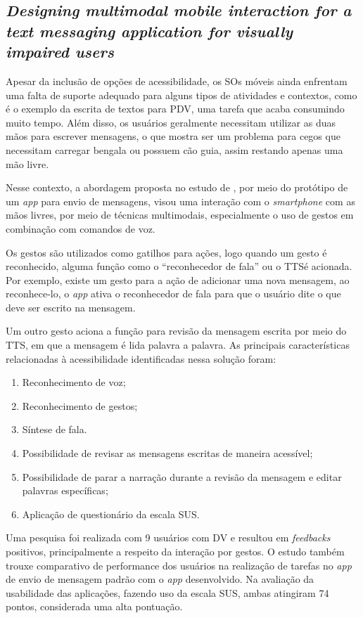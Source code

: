 \subsection{\emph{Designing multimodal mobile interaction for a text messaging application for visually impaired users}}

Apesar da inclusão de opções de acessibilidade, os SOs móveis ainda enfrentam uma falta de suporte adequado para alguns tipos de atividades e contextos, como é o exemplo da escrita de textos para PDV, uma tarefa que acaba consumindo muito tempo.
Além disso, os usuários geralmente necessitam utilizar as duas mãos para escrever mensagens, o que mostra ser um problema para cegos que necessitam carregar bengala ou possuem cão guia, assim restando apenas uma mão livre.

Nesse contexto, a abordagem proposta no estudo de , por meio do protótipo de um \emph{app} para envio de mensagens, visou uma interação com o \emph{smartphone}
com as mãos livres, por meio de técnicas multimodais, especialmente o uso de gestos em combinação com comandos de voz.

Os gestos são utilizados como gatilhos para ações, logo quando um gesto é reconhecido, alguma função como o ``reconhecedor de fala'' ou o TTS\@ é acionada.
Por exemplo, existe um gesto para a ação de adicionar uma nova mensagem, ao reconhece-lo, o \emph{app} ativa o reconhecedor de fala para que o usuário dite o que deve ser escrito na mensagem.

Um outro gesto aciona a função para revisão da mensagem escrita por meio do TTS, em que a mensagem é lida palavra a palavra.
As principais características relacionadas à acessibilidade identificadas nessa solução foram:

\begin{enumerate}
  \item Reconhecimento de voz;
  \item Reconhecimento de gestos;
  \item Síntese de fala.
  \item Possibilidade de revisar as mensagens escritas de maneira acessível;
  \item Possibilidade de parar a narração durante a revisão da mensagem e editar palavras específicas;
  \item Aplicação de questionário da escala SUS\@.
\end{enumerate}

Uma pesquisa foi realizada com 9 usuários com DV e resultou em \emph{feedbacks} positivos, principalmente a respeito da interação por gestos.
O estudo também trouxe comparativo de performance dos usuários na realização de tarefas no \emph{app} de envio de mensagem padrão com o \emph{app} desenvolvido.
Na avaliação da usabilidade das aplicações, fazendo uso da escala SUS, ambas atingiram 74 pontos, considerada uma alta pontuação.

